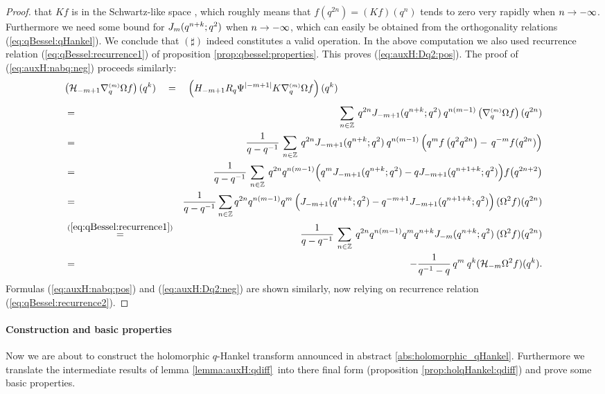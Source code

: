 \begin{proof}
that $Kf$ is in the Schwartz-like space \Swq, which roughly means that
$f(q^{2n})= (Kf)(q^n)$ tends to zero very rapidly when $n \rightarrow -\infty$.
Furthermore we need some bound for $J_{m}(q^{n+k}; q^2)$ when $n \rightarrow -\infty$,
which can easily be obtained from the orthogonality relations
(\ref{eq:qBessel:qHankel}). We conclude that $(\sharp)$ indeed constitutes a
valid operation. In the above computation we also used recurrence relation
(\ref{eq:qBessel:recurrence1}) of proposition
\ref{prop:qbessel:properties}\@. This proves (\ref{eq:auxH:Dq2:pos}).
The proof of (\ref{eq:auxH:nabq:neg}) proceeds similarly:
\begin{eqnarray*}
\lefteqn{\left(\auxH{-m+1} \nabq{m} \Omega f\right)(q^k)
    \hspace{1em} = \hspace{1em}
     \left(H_{-m+1} R_q \Psi^{|-m+1|} K \nabq{m} \Omega f\right)(q^k)} \\
   \vertXL
    &=& \sum_{n\in \ZZ} \: q^{2n} \J{-m+1}{q^{n+k}}\:
             q^{n(m-1)} \left(\nabq{m} \Omega f\right)(q^{2n}) \\
    &=& \frac{1}{q-q^{-1}}\, \sum_{n\in \ZZ} \: q^{2n} \J{-m+1}{q^{n+k}}\: q^{n(m-1)}
           \left( q^m f\left(q^2 q^{2n}\right) - \,q^{-m} f(q^{2n})\vertL \right) \\
    &=& \frac{1}{q-q^{-1}}\, \sum_{n\in \ZZ} \: q^{2n} q^{n(m-1)} \!
        \left(q^m \J{-m+1}{q^{n+k}}
             - q \J{-m+1}{q^{n+1+k}}\vertL\right)\! f\!\left(q^{2n+2}\right)\\
    &=& \frac{1}{q-q^{-1}} \sum_{n\in \ZZ} q^{2n} q^{n(m-1)}
         q^m \left(\J{-m+1}{q^{n+k}} - q^{-m+1} \J{-m+1}{q^{n+1+k}}\vertL \right)
               (\Omega^2 f)(q^{2n})\\
    &\stackrel{(\ref{eq:qBessel:recurrence1})}{=}&
       \frac{1}{q-q^{-1}} \, \sum_{n\in \ZZ} \: q^{2n} q^{n(m-1)}
          q^m q^{n+k} \J{-m}{q^{n+k}} \: (\Omega^2 f)(q^{2n})\\
    &=& -\frac{1}{q^{-1}-q}\, q^m \: q^k (\auxH{-m} \Omega^2 f)(q^k).
\end{eqnarray*}
Formulas (\ref{eq:auxH:nabq:pos}) and (\ref{eq:auxH:Dq2:neg}) are shown
similarly, now relying on recurrence relation (\ref{eq:qBessel:recurrence2}).
\end{proof}


\paragraph{Construction and basic properties}
Now we are about to construct the holomorphic $q$-Hankel transform
announced in abstract \ref{abs:holomorphic_qHankel}\@.
Furthermore we translate the intermediate results of lemma \ref{lemma:auxH:qdiff}\
into there final form (proposition \ref{prop:holqHankel:qdiff})
and prove some basic properties.

